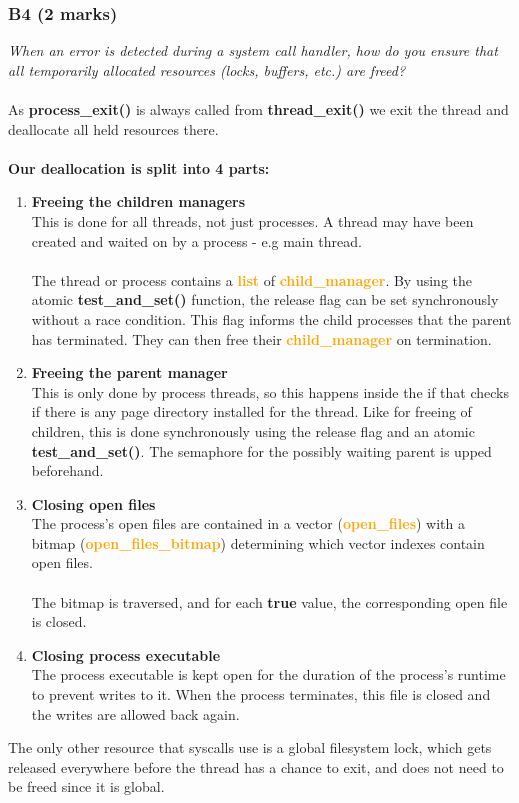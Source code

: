 \documentclass{report}
\newcommand{\question}[1]{\textit{#1} \ }
\newcommand{\sidenote}[2]{\begin{tcolorbox}[title=#1]#2\end{tcolorbox}}
\newcommand{\bullpara}[2]{\item \textbf{#1} \ #2}
\newcommand{\fun}[1]{\textcolor{Emerald}{\textbf{#1}}}
\newcommand{\struct}[1]{\textcolor{orange}{\textbf{#1}}}
\newcommand{\const}[1]{\textcolor{BrickRed}{\textbf{#1}}}
\begin{document}
            \subsubsection*{B4 (2 marks)}
                \question{When an error is detected during a system call handler, how do you ensure  that all temporarily allocated resources
                (locks, buffers, etc.) are freed?}
                \\
                \\ As \fun{process\_exit()} is always called from \fun{thread\_exit()} we exit the thread and deallocate all held resources there.
                \\
                \\ \textbf{Our deallocation is split into 4 parts:}
                \begin{enumerate}
                    \bullpara{Freeing the children managers}{
                    \\ This is done for all threads, not just processes. A thread may have been created and waited on by a process - e.g main thread. 
                    \\
                    \\ The thread or process contains a \struct{list} of \struct{child\_manager}. By using the atomic \fun{test\_and\_set()} function, 
                    the release flag can be set synchronously without a race condition. This flag informs the child processes that the parent has terminated.
                    They can then free their \struct{child\_manager} on termination.}
                    \bullpara{Freeing the parent manager}{
                    \\ This is only done by process threads, so this happens inside the if that checks if there is any page directory installed for the thread.
                    Like for freeing of children, this is done synchronously using the release flag and an atomic \fun{test\_and\_set()}.
                    The semaphore for the possibly waiting parent is upped beforehand.}
                    \bullpara{Closing open files}{
                    \\ The process's open files are contained in a vector (\struct{open\_files}) with a bitmap (\struct{open\_files\_bitmap}) determining which vector indexes contain open files.
                    \\
                    \\ The bitmap is traversed, and for each \const{true} value, the corresponding open file is closed.}
                    \bullpara{Closing process executable}{
                    \\ The process executable is kept open for the duration of the process's runtime to prevent writes to it. When the process terminates, this file is closed and the writes are allowed back again.}
                \end{enumerate}
                \sidenote{Filesystem Lock}{
                    The only other resource that syscalls use is a global filesystem lock, which gets released everywhere before the thread
                    has a chance to exit, and does not need to be freed since it is global.
                    }
                
\end{document}
